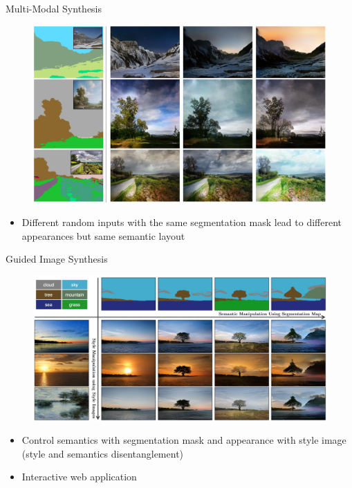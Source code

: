 \documentclass{beamer}
\begin{document}

\begin{frame}{Multi-Modal Synthesis}

\begin{figure}
    \centering
    \includegraphics[width=0.8\linewidth]{figures/multi_modal.png}
\end{figure}

\begin{itemize}
    \item Different random inputs with the same segmentation mask lead to different appearances but same semantic layout 
\end{itemize}

\end{frame}

\begin{frame}{Guided Image Synthesis}

\begin{figure}
    \centering
    \includegraphics[width=0.8\linewidth]{figures/guided_image_syn.png}
\end{figure}

\begin{itemize}
    \item Control semantics with segmentation mask and appearance with style image (style and semantics disentanglement)
    \item Interactive web application \href{https://www.nvidia.com/en-us/research/ai-playground/}{}
\end{itemize}

\end{frame}
\end{document}
